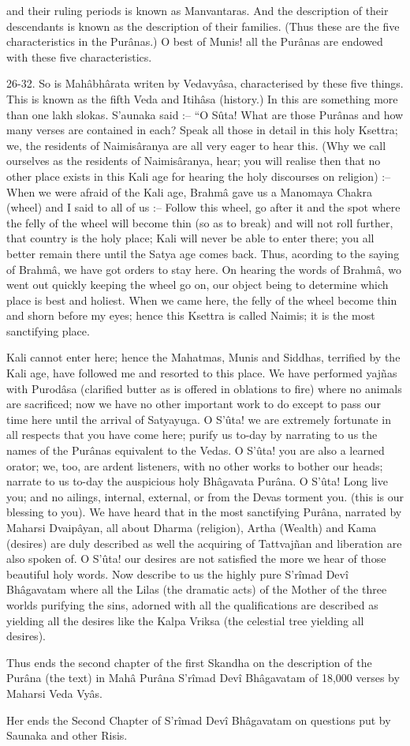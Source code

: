  

 

and their ruling periods is known as Manvantaras. And the description of their descendants is known as the description of their families. (Thus these are the five characteristics in the Purânas.) O best of Munis! all the Purânas are endowed with these five characteristics.

 

26-32. So is Mahâbhârata writen by Vedavyâsa, characterised by these five things. This is known as the fifth Veda and Itihâsa (history.) In this are something more than one lakh slokas. S’aunaka said :-- “O Sûta! What are those Purânas and how many verses are contained in each? Speak all those in detail in this holy Ksettra; we, the residents of Naimisâranya are all very eager to hear this. (Why we call ourselves as the residents of Naimisâranya, hear; you will realise then that no other place exists in this Kali age for hearing the holy discourses on religion) :-- When we were afraid of the Kali age, Brahmâ gave us a Manomaya Chakra (wheel) and I said to all of us :-- Follow this wheel, go after it and the spot where the felly of the wheel will become thin (so as to break) and will not roll further, that country is the holy place; Kali will never be able to enter there; you all better remain there until the Satya age comes back. Thus, acording to the saying of Brahmâ, we have got orders to stay here. On hearing the words of Brahmâ, wo went out quickly keeping the wheel go on, our object being to determine which place is best and holiest. When we came here, the felly of the wheel become thin and shorn before my eyes; hence this Ksettra is called Naimis; it is the most sanctifying place.

 

Kali cannot enter here; hence the Mahatmas, Munis and Siddhas, terrified by the Kali age, have followed me and resorted to this place. We have performed yajñas with Purodâsa (clarified butter as is offered in oblations to fire) where no animals are sacrificed; now we have no other important work to do except to pass our time here until the arrival of Satyayuga. O S’ûta! we are extremely fortunate in all respects that you have come here; purify us to-day by narrating to us the names of the Purânas equivalent to the Vedas. O S’ûta! you are also a learned orator; we, too, are ardent listeners, with no other works to bother our heads; narrate to us to-day the auspicious holy Bhâgavata Purâna. O S’ûta! Long live you; and no ailings, internal, external, or from the Devas torment you. (this is our blessing to you). We have heard that in the most sanctifying Purâna, narrated by Maharsi Dvaipâyan, all about Dharma (religion), Artha (Wealth) and Kama (desires) are duly described as well the acquiring of Tattvajñan and liberation are also spoken of. O S’ûta! our desires are not satisfied the more we hear of those beautiful holy words. Now describe to us the highly pure S’rîmad Devî Bhâgavatam where all the Lilas (the dramatic acts) of the Mother of the three worlds purifying the sins, adorned with all the qualifications are described as yielding all the desires like the Kalpa Vriksa (the celestial tree yielding all desires).

Thus ends the second chapter of the first Skandha on the description of the Purâna (the text) in Mahâ Purâna S’rîmad Devî Bhâgavatam of 18,000 verses by Maharsi Veda Vyâs.

Her ends the Second Chapter of S’rîmad Devî Bhâgavatam on questions put by Saunaka and other Risis.

